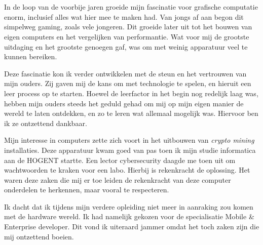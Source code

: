 
\chapter*{}%
\label{ch:voorwoord}


In de loop van de voorbije jaren groeide mijn fascinatie voor grafische computatie enorm, inclusief alles wat hier mee te maken had. Van jongs af aan begon dit simpelweg gaming, zoals vele jongeren. Dit groeide later uit tot het bouwen van eigen computers en het vergelijken van performantie. Wat voor mij de grootste uitdaging en het grootste genoegen gaf, was om met weinig apparatuur veel te kunnen bereiken. 

\bigbreak{}

Deze fascinatie kon ik verder ontwikkelen met de steun en het vertrouwen van mijn ouders. Zij gaven mij de kans om met technologie te spelen, en hieruit een leer process op te starten. Hoewel de leerfactor in het begin nog redelijk laag was, hebben mijn ouders steeds het geduld gehad om mij op mijn eigen manier de wereld te laten ontdekken, en zo te leren wat allemaal mogelijk was. Hiervoor ben ik ze ontzettend dankbaar.

\bigbreak{}

Mijn interesse in computers zette zich voort in het uitbouwen van \textit{crypto mining} installaties. Deze apparatuur kwam goed van pas toen ik mijn studie informatica aan de HOGENT startte. Een lector cybersecurity daagde me toen uit om wachtwoorden te kraken voor een labo. Hierbij is rekenkracht de oplossing. Het waren deze zaken die mij er toe leiden de rekenkracht van deze computer onderdelen te herkennen, maar vooral te respecteren. 

\bigbreak{}

Ik dacht dat ik tijdens mijn verdere opleiding niet meer in aanraking zou komen met de hardware wereld. Ik had namelijk gekozen voor de specialisatie Mobile \& Enterprise developer. Dit vond ik uiteraard jammer omdat het toch zaken zijn die mij ontzettend boeien.

